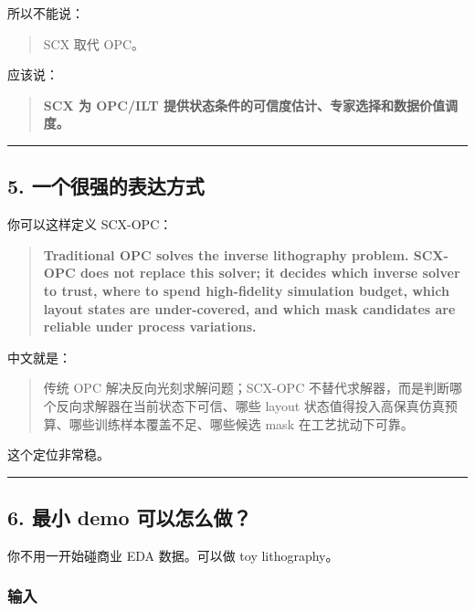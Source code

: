 \documentclass[
  12pt,
]{ctexart}
\begin{document}
所以不能说：

\begin{quote}
SCX 取代 OPC。
\end{quote}

应该说：

\begin{quote}
\textbf{SCX 为 OPC/ILT
提供状态条件的可信度估计、专家选择和数据价值调度。}
\end{quote}

\begin{center}\rule{0.5\linewidth}{0.5pt}\end{center}

\subsection{5.
一个很强的表达方式}\label{ux4e00ux4e2aux5f88ux5f3aux7684ux8868ux8fbeux65b9ux5f0f}

你可以这样定义 SCX-OPC：

\begin{quote}
\textbf{Traditional OPC solves the inverse lithography problem. SCX-OPC
does not replace this solver; it decides which inverse solver to trust,
where to spend high-fidelity simulation budget, which layout states are
under-covered, and which mask candidates are reliable under process
variations.}
\end{quote}

中文就是：

\begin{quote}
传统 OPC 解决反向光刻求解问题；SCX-OPC
不替代求解器，而是判断哪个反向求解器在当前状态下可信、哪些 layout
状态值得投入高保真仿真预算、哪些训练样本覆盖不足、哪些候选 mask
在工艺扰动下可靠。
\end{quote}

这个定位非常稳。

\begin{center}\rule{0.5\linewidth}{0.5pt}\end{center}

\subsection{6. 最小 demo
可以怎么做？}\label{ux6700ux5c0f-demo-ux53efux4ee5ux600eux4e48ux505a}

你不用一开始碰商业 EDA 数据。可以做 toy lithography。

\subsubsection{输入}\label{ux8f93ux5165-1}
\end{document}
